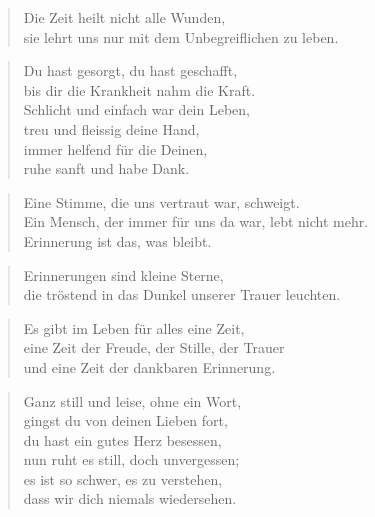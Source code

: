 \documentclass[ngerman,a4paper,11pt]{scrreprt}
\begin{document}
\begin{verse}
Die Zeit heilt nicht alle Wunden, \\
sie lehrt uns nur mit dem Unbegreiflichen zu leben. \\
\end{verse}

\begin{verse}
Du hast gesorgt, du hast geschafft, \\
bis dir die Krankheit nahm die Kraft. \\
Schlicht und einfach war dein Leben, \\
treu und fleissig deine Hand, \\
immer helfend für die Deinen, \\
ruhe sanft und habe Dank. \\
\end{verse}

\begin{verse}
Eine Stimme, die uns vertraut war, schweigt. \\
Ein Mensch, der immer für uns da war, lebt nicht mehr. \\
Erinnerung ist das, was bleibt. \\
\end{verse}

\begin{verse}
Erinnerungen sind kleine Sterne, \\
die tröstend in das Dunkel unserer Trauer leuchten. \\
\end{verse}

\begin{verse}
Es gibt im Leben für alles eine Zeit, \\
eine Zeit der Freude, der Stille, der Trauer \\
und eine Zeit der dankbaren Erinnerung. \\
\end{verse}

\begin{verse}
Ganz still und leise, ohne ein Wort, \\
gingst du von deinen Lieben fort, \\
du hast ein gutes Herz besessen, \\
nun ruht es still, doch unvergessen; \\
es ist so schwer, es zu verstehen, \\
dass wir dich niemals wiedersehen. \\
\end{verse}
\end{document}

